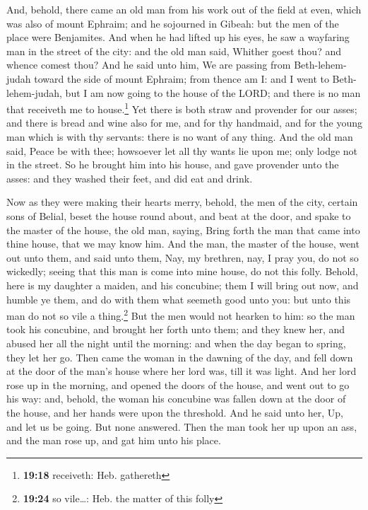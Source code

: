  And, behold, there came an old man from his work out of
the field at even, which was also of mount Ephraim; and he sojourned in
Gibeah: but the men of the place were Benjamites.  And
when he had lifted up his eyes, he saw a wayfaring man in the street of
the city: and the old man said, Whither goest thou? and whence comest
thou?  And he said unto him, We are passing from
Beth-lehem-judah toward the side of mount Ephraim; from thence am I: and
I went to Beth-lehem-judah, but I am now going to the house of the LORD;
and there is no man that receiveth me to house.\footnote{\textbf{19:18}
  receiveth: Heb. gathereth}  Yet there is both straw and
provender for our asses; and there is bread and wine also for me, and
for thy handmaid, and for the young man which is with thy servants:
there is no want of any thing.  And the old man said,
Peace be with thee; howsoever let all thy wants lie upon me; only lodge
not in the street.  So he brought him into his house, and
gave provender unto the asses: and they washed their feet, and did eat
and drink.

 Now as they were making their hearts merry, behold, the
men of the city, certain sons of Belial, beset the house round about,
and beat at the door, and spake to the master of the house, the old man,
saying, Bring forth the man that came into thine house, that we may know
him.  And the man, the master of the house, went out unto
them, and said unto them, Nay, my brethren, nay, I pray you, do not so
wickedly; seeing that this man is come into mine house, do not this
folly.  Behold, here is my daughter a maiden, and his
concubine; them I will bring out now, and humble ye them, and do with
them what seemeth good unto you: but unto this man do not so vile a
thing.\footnote{\textbf{19:24} so vile\ldots: Heb. the matter of this
  folly}  But the men would not hearken to him: so the
man took his concubine, and brought her forth unto them; and they knew
her, and abused her all the night until the morning: and when the day
began to spring, they let her go.  Then came the woman in
the dawning of the day, and fell down at the door of the man's house
where her lord was, till it was light.  And her lord rose
up in the morning, and opened the doors of the house, and went out to go
his way: and, behold, the woman his concubine was fallen down at the
door of the house, and her hands were upon the threshold.
 And he said unto her, Up, and let us be going. But none
answered. Then the man took her up upon an ass, and the man rose up, and
gat him unto his place.


